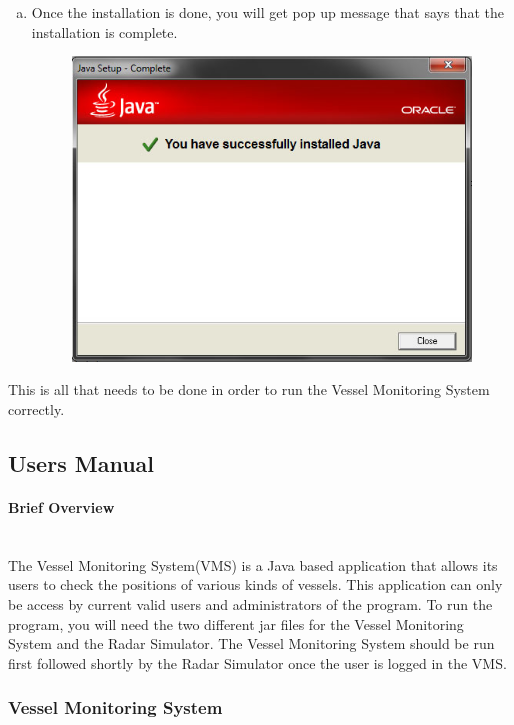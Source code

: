 \documentclass{article}
\begin{document}
\begin{enumerate}[(a)]
\begin{figure}[!htb]
	\end{figure}
  \item Once the installation is done, you will get pop up message that says that the installation is complete.
	\begin{figure}[!htb]
	\centering
	\includegraphics[scale=0.55]{images/javaInstall3.jpg}
	\end{figure}
\end{enumerate}

This is all that needs to be done in order to run the Vessel Monitoring System correctly.
\pagebreak
\subsection{Users Manual}
\paragraph{Brief Overview \\ \\}

The Vessel Monitoring System(VMS) is a Java based application that allows its users to check the positions of various kinds of vessels. This application can only be access by current valid users and administrators of the program. To run the program, you will need the two different jar files for the Vessel Monitoring System and the Radar Simulator. The Vessel Monitoring System should be run first followed shortly by the Radar Simulator once the user is logged in the VMS.

\subsubsection{Vessel Monitoring System}
\end{document}
